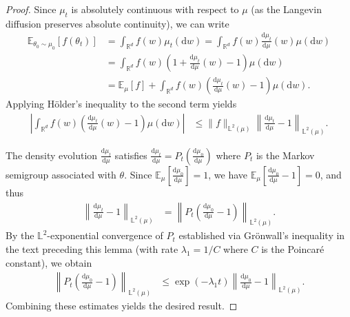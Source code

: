 \documentclass[11pt]{article}
\theoremstyle{plain}
\theoremstyle{definition}
\theoremstyle{remark}
\numberwithin{equation}{section}
\newcommand{\R}{\mathbb{R}}
\renewcommand{\L}{\mathscr{L}}
\renewcommand{\d}{\mathrm{d}}
\newcommand{\lb}{\left}
\newcommand{\rb}{\right}
\newcommand{\bL}{\mathbb{L}}
\newcommand{\E}{\mathbb{E}}
\begin{document}
\begin{proof}
{Since $\mu_t$ is absolutely continuous with respect to $\mu$ (as the Langevin diffusion preserves absolute continuity), we can write}
\begin{align*}
\E_{\theta_0\sim\mu_0}\lb[f(\theta_t)\rb] 
&= \int_{\R^d} f(w) \mu_t(\d w) = \int_{\R^d} f(w) \frac{\d\mu_t}{\d\mu}(w) \mu(\d w)\\
&= \int_{\R^d} f(w) \lb(1 + \frac{\d\mu_t}{\d\mu}(w) - 1\rb) \mu(\d w)\\
&= \E_\mu[f] + \int_{\R^d} f(w) \lb(\frac{\d\mu_t}{\d\mu}(w) - 1\rb) \mu(\d w).
\end{align*}
{Applying H\"{o}lder's inequality to the second term yields
\begin{align*}
\lb|\int_{\R^d} f(w) \lb(\frac{\d\mu_t}{\d\mu}(w) - 1\rb) \mu(\d w)\rb|
&\leq \|f\|_{\bL^2(\mu)} \lb\|\frac{\d\mu_t}{\d\mu} - 1\rb\|_{\bL^2(\mu)}.
\end{align*}}

{The density evolution $\frac{\d\mu_t}{\d\mu}$ satisfies $\frac{\d\mu_t}{\d\mu} = P_t\lb(\frac{\d\mu_0}{\d\mu}\rb)$ where $P_t$ is the Markov semigroup associated with $\theta$. Since $\E_\mu\lb[\frac{\d\mu_0}{\d\mu}\rb] = 1$, we have $\E_\mu\lb[\frac{\d\mu_0}{\d\mu} - 1\rb] = 0$, and thus}
\begin{align*}
\lb\|\frac{\d\mu_t}{\d\mu} - 1\rb\|_{\bL^2(\mu)} 
&= \lb\|P_t\lb(\frac{\d\mu_0}{\d\mu} - 1\rb)\rb\|_{\bL^2(\mu)}.
\end{align*}
{By the $\bL^2$-exponential convergence of $P_t$ established via Gr\"{o}nwall's inequality in the text preceding this lemma (with rate $\lambda_1 = 1/C$ where $C$ is the Poincar\'{e} constant), we obtain
\begin{align*}
\lb\|P_t\lb(\frac{\d\mu_0}{\d\mu} - 1\rb)\rb\|_{\bL^2(\mu)}
&\leq \exp\lb(-\lambda_1 t\rb) \lb\|\frac{\d\mu_0}{\d\mu} - 1\rb\|_{\bL^2(\mu)}.
\end{align*}
Combining these estimates yields the desired result.}
\end{proof}

\end{document}
